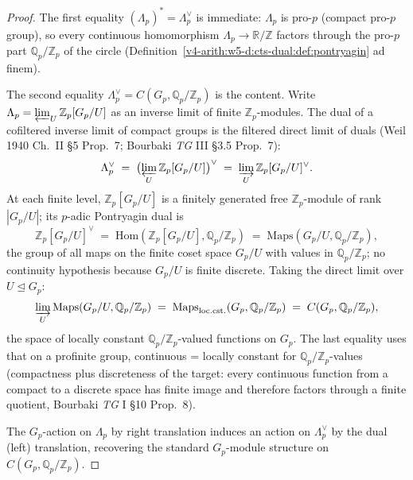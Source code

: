 \begin{proof}
The first equality \((\Lambda_{p})^{\ast}=\Lambda_{p}^{\vee}\) is
immediate: \(\Lambda_{p}\) is pro-\(p\) (compact pro-\(p\) group), so every
continuous homomorphism \(\Lambda_{p}\to\mathbb{R}/\mathbb{Z}\) factors
through the pro-\(p\) part \(\mathbb{Q}_{p}/\mathbb{Z}_{p}\) of the circle
(Definition~\ref{v4-arith:w5-d:cts-dual:def:pontryagin} ad finem).

The second equality \(\Lambda_{p}^{\vee}=C(G_{p},\mathbb{Q}_{p}/\mathbb{Z}_{p})\)
is the content. Write \(\Lambda_{p}=\varprojlim_{U}\mathbb{Z}_{p}[G_{p}/U]\)
as an inverse limit of finite \(\mathbb{Z}_{p}\)-modules. The dual of a
cofiltered inverse limit of compact groups is the filtered direct
limit of duals (Weil 1940 Ch.~II \S5 Prop.~7; Bourbaki \emph{TG} III
\S3.5 Prop.~7):
\begin{equation}
\label{v4-arith:w5-d:eq:dual-limit}
\Lambda_{p}^{\vee}\;=\;\bigl(\varprojlim_{U}\mathbb{Z}_{p}[G_{p}/U]\bigr)^{\vee}\;=\;\varinjlim_{U}\mathbb{Z}_{p}[G_{p}/U]^{\vee}.
\end{equation}
At each finite level, \(\mathbb{Z}_{p}[G_{p}/U]\) is a finitely generated
free \(\mathbb{Z}_{p}\)-module of rank \(|G_{p}/U|\); its \(p\)-adic
Pontryagin dual is
\begin{equation}
\label{v4-arith:w5-d:eq:finite-level-dual}
\mathbb{Z}_{p}[G_{p}/U]^{\vee}\;=\;\mathrm{Hom}(\mathbb{Z}_{p}[G_{p}/U],\mathbb{Q}_{p}/\mathbb{Z}_{p})\;=\;\mathrm{Maps}(G_{p}/U,\mathbb{Q}_{p}/\mathbb{Z}_{p}),
\end{equation}
the group of all maps on the finite coset space \(G_{p}/U\) with values
in \(\mathbb{Q}_{p}/\mathbb{Z}_{p}\); no continuity hypothesis because
\(G_{p}/U\) is finite discrete. Taking the direct limit over
\(U\trianglelefteq G_{p}\):
\begin{equation}
\label{v4-arith:w5-d:eq:direct-limit-maps}
\varinjlim_{U}\mathrm{Maps}(G_{p}/U,\mathbb{Q}_{p}/\mathbb{Z}_{p})\;=\;\mathrm{Maps}_{\mathrm{loc.cst.}}(G_{p},\mathbb{Q}_{p}/\mathbb{Z}_{p})\;=\;C(G_{p},\mathbb{Q}_{p}/\mathbb{Z}_{p}),
\end{equation}
the space of locally constant \(\mathbb{Q}_{p}/\mathbb{Z}_{p}\)-valued
functions on \(G_{p}\). The last equality uses that on a profinite
group, continuous = locally constant for \(\mathbb{Q}_{p}/\mathbb{Z}_{p}\)-values
(compactness plus discreteness of the target: every continuous
function from a compact to a discrete space has finite image and
therefore factors through a finite quotient, Bourbaki \emph{TG} I
\S10 Prop.~8).

The \(G_{p}\)-action on \(\Lambda_{p}\) by right translation induces an
action on \(\Lambda_{p}^{\vee}\) by the dual (left) translation,
recovering the standard \(G_{p}\)-module structure on
\(C(G_{p},\mathbb{Q}_{p}/\mathbb{Z}_{p})\).
\end{proof}

